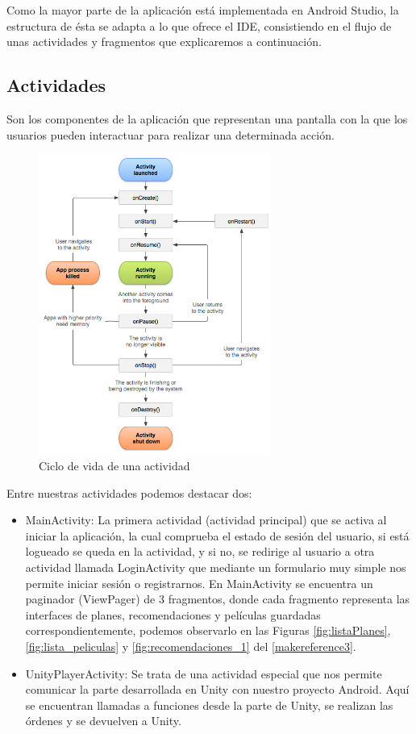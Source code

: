 Como la mayor parte de la aplicación está implementada en Android Studio, la estructura de ésta se adapta a lo que ofrece el IDE, consistiendo en el flujo de unas actividades y fragmentos que explicaremos a continuación.


\subsection{Actividades}
\label{makereference4.4.1}
Son los componentes de la aplicación que representan una pantalla con la que los usuarios pueden interactuar para realizar una determinada acción.

\begin{figure}[H]
    \centering
    \includegraphics[width=3in]{figures/chapter-4/activity_lifecycle.png}
    \caption{Ciclo de vida de una actividad}
\end{figure}

Entre nuestras actividades podemos destacar dos: 
\begin{itemize}
    \item MainActivity: La primera actividad (actividad principal) que se activa al iniciar la aplicación, la cual comprueba el estado de sesión del usuario, si está logueado se queda en la actividad, y si no, se redirige al usuario a otra actividad llamada LoginActivity que mediante un formulario muy simple nos permite iniciar sesión o registrarnos. En MainActivity se encuentra un paginador (ViewPager) de 3 fragmentos, donde cada fragmento representa las interfaces de planes, recomendaciones y películas guardadas correspondientemente, podemos observarlo en las Figuras \ref{fig:listaPlanes}, \ref{fig:lista_peliculas} y \ref{fig:recomendaciones_1} del \autoref{makereference3}.
    \item UnityPlayerActivity: Se trata de una actividad especial que nos permite comunicar la parte desarrollada en Unity con nuestro proyecto Android. Aquí se encuentran llamadas a funciones desde la parte de Unity, se realizan las órdenes y se devuelven a Unity.
\end{itemize} 

